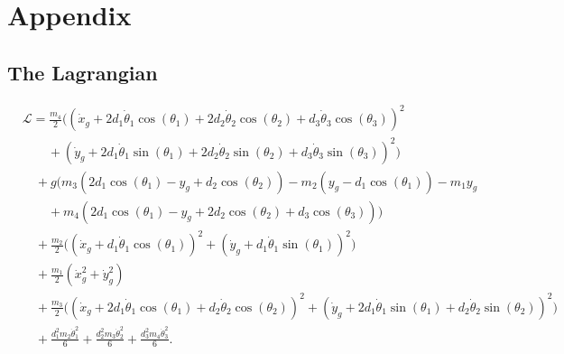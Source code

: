\documentclass{article}
\begin{document}
\section{Appendix}
\subsection{The Lagrangian}
\[
\begin{aligned}
	& \mathcal{L} = \frac{m_4}{2}\bigl((\dot{x}_g + 2d_1\dot{\theta}_1\cos(\theta_1) + 2d_2\dot{\theta}_2\cos(\theta_2) 
	+ d_3\dot{\theta}_3\cos(\theta_3))^2 \\
	&\qquad + (\dot{y}_g + 2d_1\dot{\theta}_1\sin(\theta_1) + 2d_2\dot{\theta}_2\sin(\theta_2) 
	+ d_3\dot{\theta}_3\sin(\theta_3))^2 \bigr) \\
	&\quad + g\bigl(m_3(2d_1\cos(\theta_1) - y_g + d_2\cos(\theta_2)) 
	- m_2(y_g - d_1\cos(\theta_1)) - m_1y_g \\
	&\qquad + m_4(2d_1\cos(\theta_1) - y_g + 2d_2\cos(\theta_2) + d_3\cos(\theta_3))\bigr) \\
	&\quad + \frac{m_2}{2}\bigl((\dot{x}_g + d_1\dot{\theta}_1\cos(\theta_1))^2 
	+ (\dot{y}_g + d_1\dot{\theta}_1\sin(\theta_1))^2\bigr) \\
	&\quad + \frac{m_1}{2}(\dot{x}_g^2 + \dot{y}_g^2) \\
	&\quad + \frac{m_3}{2}\bigl((\dot{x}_g + 2d_1\dot{\theta}_1\cos(\theta_1) + d_2\dot{\theta}_2\cos(\theta_2))^2 
	+ (\dot{y}_g + 2d_1\dot{\theta}_1\sin(\theta_1) + d_2\dot{\theta}_2\sin(\theta_2))^2\bigr) \\
	&\quad + \frac{d_1^2 m_2 \dot{\theta}_1^2}{6} 
	+ \frac{d_2^2 m_3 \dot{\theta}_2^2}{6} 
	+ \frac{d_3^2 m_4 \dot{\theta}_3^2}{6}.
\end{aligned}
\]
\end{document}
